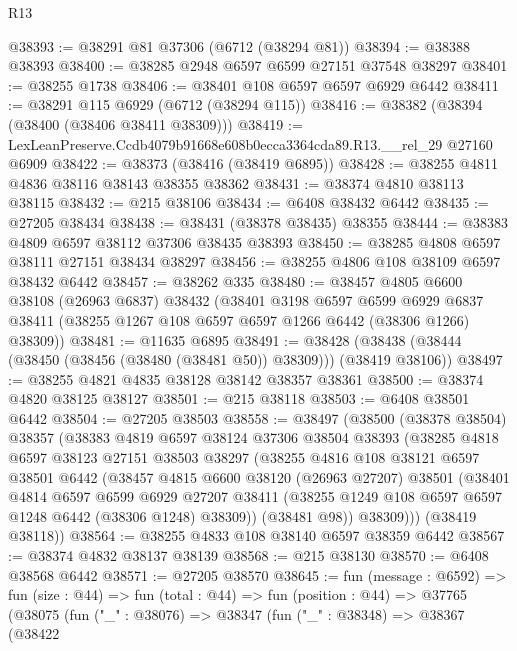 \begin{lexlean}{R13}
\begin{coremodule}
@38393 := @38291 @81 @37306 (@6712 (@38294 @81))
@38394 := @38388 @38393
@38400 := @38285 @2948 @6597 @6599 @27151 @37548 @38297
@38401 := @38255 @1738
@38406 := @38401 @108 @6597 @6597 @6929 @6442
@38411 := @38291 @115 @6929 (@6712 (@38294 @115))
@38416 := @38382 (@38394 (@38400 (@38406 @38411 @38309)))
@38419 := LexLeanPreserve.Ccdb4079b91668e608b0ecca3364cda89.R13.__rel_29 @27160 @6909
@38422 := @38373 (@38416 (@38419 @6895))
@38428 := @38255 @4811 @4836 @38116 @38143 @38355 @38362
@38431 := @38374 @4810 @38113 @38115
@38432 := @215 @38106
@38434 := @6408 @38432 @6442
@38435 := @27205 @38434
@38438 := @38431 (@38378 @38435) @38355
@38444 := @38383 @4809 @6597 @38112 @37306 @38435 @38393
@38450 := @38285 @4808 @6597 @38111 @27151 @38434 @38297
@38456 := @38255 @4806 @108 @38109 @6597 @38432 @6442
@38457 := @38262 @335
@38480 := @38457
    @4805
    @6600
    @38108
    (@26963 @6837)
    @38432
    (@38401
      @3198
      @6597
      @6599
      @6929
      @6837
      @38411
      (@38255 @1267 @108 @6597 @6597 @1266 @6442 (@38306 @1266) @38309))
@38481 := @11635 @6895
@38491 := @38428 (@38438 (@38444 (@38450 (@38456 (@38480 (@38481 @50)) @38309))) (@38419 @38106))
@38497 := @38255 @4821 @4835 @38128 @38142 @38357 @38361
@38500 := @38374 @4820 @38125 @38127
@38501 := @215 @38118
@38503 := @6408 @38501 @6442
@38504 := @27205 @38503
@38558 := @38497
    (@38500
      (@38378 @38504)
      @38357
      (@38383
        @4819
        @6597
        @38124
        @37306
        @38504
        @38393
        (@38285
          @4818
          @6597
          @38123
          @27151
          @38503
          @38297
          (@38255
            @4816
            @108
            @38121
            @6597
            @38501
            @6442
            (@38457
              @4815
              @6600
              @38120
              (@26963 @27207)
              @38501
              (@38401
                @4814
                @6597
                @6599
                @6929
                @27207
                @38411
                (@38255 @1249 @108 @6597 @6597 @1248 @6442 (@38306 @1248) @38309))
              (@38481 @98))
            @38309)))
      (@38419 @38118))
@38564 := @38255 @4833 @108 @38140 @6597 @38359 @6442
@38567 := @38374 @4832 @38137 @38139
@38568 := @215 @38130
@38570 := @6408 @38568 @6442
@38571 := @27205 @38570
@38645 := fun (message : @6592) =>
  fun (size : @44) =>
  fun (total : @44) =>
  fun (position : @44) =>
  @37765
    (@38075
      (fun ("_" : @38076) =>
      @38347
        (fun ("_" : @38348) =>
        @38367
          (@38422

\end{coremodule}
\end{lexlean}
